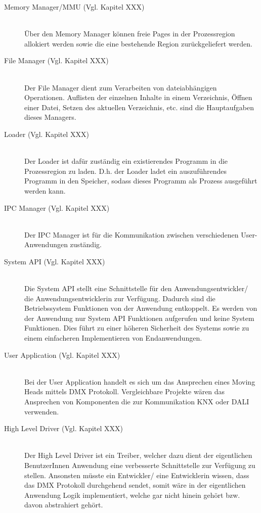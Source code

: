 \begin{description}
	\item[Memory Manager/MMU (Vgl. Kapitel XXX)] \hfill \\
	Über den Memory Manager können freie Pages in der Prozessregion allokiert werden sowie die eine bestehende Region zurückgeliefert werden.

	\item[File Manager (Vgl. Kapitel XXX)] \hfill \\
	Der File Manager dient zum Verarbeiten von dateiabhängigen Operationen. Auflisten der einzelnen Inhalte in einem Verzeichnis, Öffnen einer Datei, Setzen des aktuellen Verzeichnis, etc. sind die Hauptaufgaben dieses Managers.
	
	\item[Loader (Vgl. Kapitel XXX)] \hfill \\
	Der Loader ist dafür zuständig ein existierendes Programm in die Prozessregion zu laden. D.h. der Loader ladet ein auszuführendes Programm in den Speicher, sodass dieses Programm als Prozess ausgeführt werden kann.
	
	\item[IPC Manager (Vgl. Kapitel XXX)] \hfill \\
	Der IPC Manager ist für die Kommunikation zwischen verschiedenen User-Anwendungen zuständig.
	
	\item[System API (Vgl. Kapitel XXX)] \hfill \\
	Die System API stellt eine Schnittstelle für den Anwendungsentwickler/ die Anwendungsentwicklerin zur Verfügung. Dadurch sind die Betriebssystem Funktionen von der Anwendung entkoppelt. Es werden von der Anwendung nur System API Funktionen aufgerufen und keine System Funktionen. Dies führt zu einer höheren Sicherheit des Systems sowie zu einem einfacheren Implementieren von Endanwendungen.
	
	\item[User Application (Vgl. Kapitel XXX)] \hfill \\
	Bei der User Application handelt es sich um das Ansprechen eines Moving Heads mittels DMX Protokoll. Vergleichbare Projekte wären das Ansprechen von Komponenten die zur Kommunikation KNX oder DALI verwenden.
	
	\item[High Level Driver (Vgl. Kapitel XXX)] \hfill \\
	Der High Level Driver ist ein Treiber, welcher dazu dient der eigentlichen BenutzerInnen Anwendung eine verbesserte Schnittstelle zur Verfügung zu stellen. Ansonsten müsste ein Entwickler/ eine Entwicklerin wissen, dass das DMX Protokoll durchgehend sendet, somit wäre in der eigentlichen Anwendung Logik implementiert, welche gar nicht hinein gehört bzw. davon abstrahiert gehört.
\end{description}

\pagebreak 